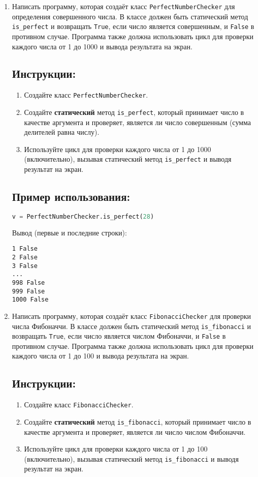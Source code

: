 \begin{enumerate}
\item
Написать программу, которая создаёт класс \texttt{PerfectNumberChecker} 
для определения совершенного числа. В классе должен быть статический метод
\texttt{is\_perfect} и возвращать \texttt{True}, если число является совершенным, 
и \texttt{False} в противном случае. 
Программа также должна использовать цикл для проверки каждого числа от 
1 до 1000 и вывода результата на экран.

\subsection*{Инструкции:}
\begin{enumerate}
    \item Создайте класс \texttt{PerfectNumberChecker}.
    \item Создайте \textbf{статический} метод \texttt{is\_perfect}, который принимает число в качестве аргумента и проверяет, является ли число совершенным (сумма делителей равна числу).
    \item Используйте цикл для проверки каждого числа от 1 до 1000 (включительно), вызывая статический метод \texttt{is\_perfect} и выводя результат на экран.
\end{enumerate}

\subsection*{Пример использования:}
\begin{lstlisting}[language=Python]
    v = PerfectNumberChecker.is_perfect(28)
\end{lstlisting}
Вывод (первые и последние строки):
\begin{verbatim}
1 False
2 False
3 False
...
998 False
999 False
1000 False
\end{verbatim}

\item
Написать программу, которая создаёт класс \texttt{FibonacciChecker} 
для проверки числа Фибоначчи. В классе должен быть статический метод
\texttt{is\_fibonacci} и возвращать \texttt{True}, если число является числом Фибоначчи, 
и \texttt{False} в противном случае. 
Программа также должна использовать цикл для проверки каждого числа от 
1 до 100 и вывода результата на экран.

\subsection*{Инструкции:}
\begin{enumerate}
    \item Создайте класс \texttt{FibonacciChecker}.
    \item Создайте \textbf{статический} метод \texttt{is\_fibonacci}, который принимает число в качестве аргумента и проверяет, является ли число числом Фибоначчи.
    \item Используйте цикл для проверки каждого числа от 1 до 100 (включительно), вызывая статический метод \texttt{is\_fibonacci} и выводя результат на экран.
\end{enumerate}


\end{enumerate}
